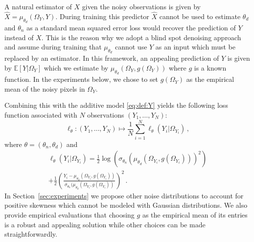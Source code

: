 \documentclass{article}
\begin{document}
A natural estimator of $X$ given the noisy observations is given by $\widehat X = \mu_{\theta_d}(\Omega_Y,Y)$. During training this predictor $\widehat X$ cannot be used to estimate $\theta_d$ and $\theta_n$ as  a standard mean squared error loss would recover the prediction of $Y$ instead of $X$. This is the reason why we adopt a blind spot denoising approach and assume during training that $\mu_{\theta_d}$ cannot use $Y$ as an input which must be replaced by an estimator. In this framework, an appealing prediction of $Y$ is given by $\mathbb{E}[Y|\Omega_Y]$ which we estimate by $\mu_{\theta_d}(\Omega_Y,g(\Omega_Y))$ where $g$ is a known function. In the experiments below, we chose to set $g(\Omega_Y)$ as the empirical mean of the noisy pixels in $\Omega_Y$.

Combining this with the additive model  \eqref{eq:def:Y} yields the following loss function associated with $N$ observations $(Y_1,\ldots,Y_N)$:
$$
\ell_{\theta}: (Y_1,\ldots,Y_N) \mapsto \frac{1}{N}\sum_{i=1}^N \ell_{\theta}(Y_i|\Omega_{Y_i})\,,
$$
where $\theta = (\theta_n,\theta_d)$ and
\begin{multline*}
\ell_{\theta}(Y_i|\Omega_{Y_i}) = \frac{1}{2}\log(\sigma_{\theta_n}( \mu_{\theta_d}(\Omega_{Y_i},g(\Omega_{Y_i})))^2) \\
+\frac{1}{2}\left(\frac{Y_i-\mu_{\theta_d}(\Omega_{Y_i},g(\Omega_{Y_i}))}{\sigma_{\theta_n}(\mu_{\theta_d}(\Omega_{Y_i},g(\Omega_{Y_i}))}\right)^2\,. %
\end{multline*}
In Section~\ref{sec:experiments} we propose other noise distributions to account for positive skewness which cannot be modeled with Gaussian distributions. We also provide empirical evaluations that choosing $g$ as the empirical mean of its entries is a robust and appealing solution while other choices can be made straightforwardly.
\end{document}
